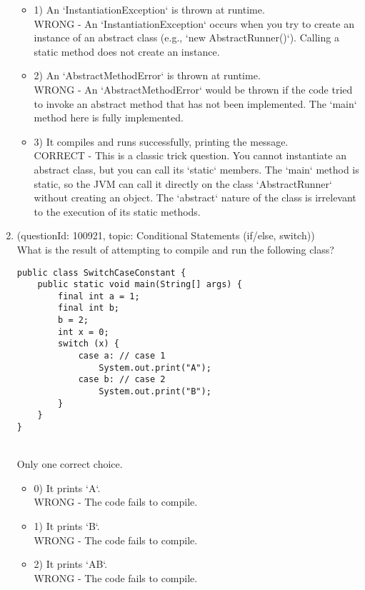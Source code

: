\documentclass[12pt]{article}
\begin{document}
\begin{enumerate}[label=(\arabic*)]
\begin{itemize}
\item 1) An `InstantiationException` is thrown at runtime.
 \\ 
WRONG - An `InstantiationException` occurs when you try to create an instance of an abstract class (e.g., `new AbstractRunner()`). Calling a static method does not create an instance.

\item 2) An `AbstractMethodError` is thrown at runtime.
 \\ 
WRONG - An `AbstractMethodError` would be thrown if the code tried to invoke an abstract method that has not been implemented. The `main` method here is fully implemented.

\item 3) It compiles and runs successfully, printing the message.
 \\ 
CORRECT - This is a classic trick question. You cannot instantiate an abstract class, but you can call its `static` members. The `main` method is static, so the JVM can call it directly on the class `AbstractRunner` without creating an object. The `abstract` nature of the class is irrelevant to the execution of its static methods.

\end{itemize}
\item (questionId: 100921, topic: Conditional Statements (if/else, switch)) \\ 
What is the result of attempting to compile and run the following class?\n\begin{verbatim}
public class SwitchCaseConstant {
    public static void main(String[] args) {
        final int a = 1;
        final int b;
        b = 2;
        int x = 0;
        switch (x) {
            case a: // case 1
                System.out.print("A");
            case b: // case 2
                System.out.print("B");
        }
    }
}
\end{verbatim}
\\ \noindent Only one correct choice. 
\begin{itemize}
\item 0) It prints `A`.
 \\ 
WRONG - The code fails to compile.

\item 1) It prints `B`.
 \\ 
WRONG - The code fails to compile.

\item 2) It prints `AB`.
 \\ 
WRONG - The code fails to compile.


\end{itemize}
\end{enumerate}
\end{document}
